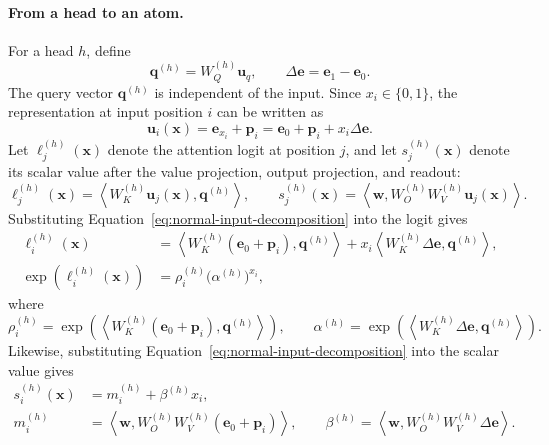 \documentclass{article}
\theoremstyle{definition}
\theoremstyle{plain}
\begin{document}
\paragraph{From a head to an atom.}
\label{app:from-head-to-atom}
For a head $h$, define
\begin{equation}
\mathbf{q}^{(h)}=W_Q^{(h)}\mathbf{u}_q,
\qquad
\Delta\mathbf{e}=\mathbf{e}_1-\mathbf{e}_0.
\end{equation}
The query vector $\mathbf{q}^{(h)}$ is independent of the input. Since $x_i\in\{0,1\}$, the representation at input position $i$ can be written as
\begin{equation}
\mathbf{u}_i(\mathbf{x})
=\mathbf{e}_{x_i}+\mathbf{p}_i
=\mathbf{e}_0+\mathbf{p}_i+x_i\Delta\mathbf{e}.
\label{eq:normal-input-decomposition}
\end{equation}
Let $\ell_j^{(h)}(\mathbf{x})$ denote the attention logit at position $j$, and let $s_j^{(h)}(\mathbf{x})$ denote its scalar value after the value projection, output projection, and readout:
\begin{equation}
\ell_j^{(h)}(\mathbf{x})
=\left\langle W_K^{(h)}\mathbf{u}_j(\mathbf{x}),\mathbf{q}^{(h)}\right\rangle,
\qquad
s_j^{(h)}(\mathbf{x})
=\left\langle\mathbf{w},W_O^{(h)}W_V^{(h)}\mathbf{u}_j(\mathbf{x})\right\rangle.
\end{equation}
Substituting Equation~\eqref{eq:normal-input-decomposition} into the logit gives
\begin{align}
\ell_i^{(h)}(\mathbf{x})
&=\left\langle W_K^{(h)}(\mathbf{e}_0+\mathbf{p}_i),\mathbf{q}^{(h)}\right\rangle
+x_i\left\langle W_K^{(h)}\Delta\mathbf{e},\mathbf{q}^{(h)}\right\rangle,
\label{eq:normal-logit-expansion}\\
\exp\!\left(\ell_i^{(h)}(\mathbf{x})\right)
&=\rho_i^{(h)}\bigl(\alpha^{(h)}\bigr)^{x_i},
\label{eq:normal-logit-factorization}
\end{align}
where
\begin{equation}
\rho_i^{(h)}
=\exp\!\left(\left\langle W_K^{(h)}(\mathbf{e}_0+\mathbf{p}_i),\mathbf{q}^{(h)}\right\rangle\right),
\qquad
\alpha^{(h)}
=\exp\!\left(\left\langle W_K^{(h)}\Delta\mathbf{e},\mathbf{q}^{(h)}\right\rangle\right).
\end{equation}
Likewise, substituting Equation~\eqref{eq:normal-input-decomposition} into the scalar value gives
\begin{align}
s_i^{(h)}(\mathbf{x})
&=m_i^{(h)}+\beta^{(h)}x_i,
\label{eq:normal-value-factorization}\\
m_i^{(h)}
&=\left\langle\mathbf{w},W_O^{(h)}W_V^{(h)}(\mathbf{e}_0+\mathbf{p}_i)\right\rangle,
\qquad
\beta^{(h)}
=\left\langle\mathbf{w},W_O^{(h)}W_V^{(h)}\Delta\mathbf{e}\right\rangle.
\end{align}
\end{document}
